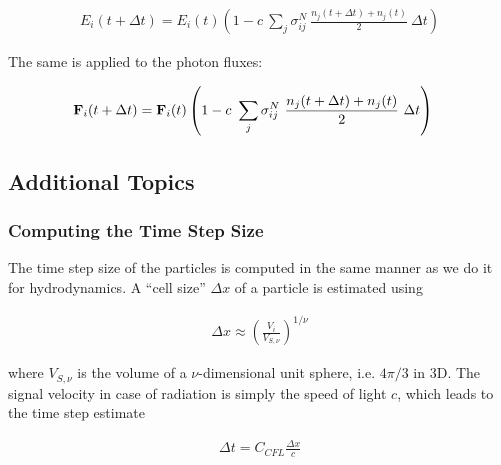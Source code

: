 \begin{align}
E_i (t + \Delta t)
    = E_i(t) \left(1 - c \ \sum_j \sigma_{i j} ^ N  \
    \frac{n_j(t + \Delta t) + n_j(t)}{2} \ \Delta t \right)
\end{align}

The same is applied to the photon fluxes:

\begin{align}
\mathbf{F}_i (t + \Delta t)
    &= \mathbf{F}_i(t) \left(1 - c \ \sum_j \sigma_{i j} ^ N  \
    \frac{n_j(t + \Delta t) + n_j(t)}{2} \ \Delta t \right)
\end{align}






















\subsection{Additional Topics}


\subsubsection{Computing the Time Step Size}

The time step size of the particles is computed in the same manner as we do it for hydrodynamics.
A ``cell size'' $\Delta x$ of a particle is estimated using

\begin{align}
    \Delta x \approx \left(\frac{V_i}{V_{S,\nu}} \right)^{1/\nu}
\end{align}

where $V_{S,\nu}$ is the volume of a $\nu$-dimensional unit sphere, i.e. $4 \pi / 3$ in 3D. The
signal velocity in case of radiation is simply the speed of light $c$, which leads to the time step
estimate

\begin{align}
    \Delta t = C_{CFL} \frac{\Delta x}{c} \label{eq:rt-cfl}
\end{align}



